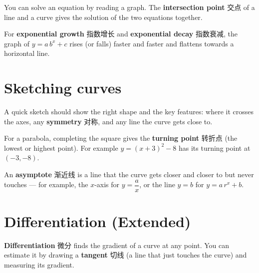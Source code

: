 \documentclass[11pt]{article}
\begin{document}
You can solve an equation by reading a graph. The \textbf{intersection point} 交点 of a line and a curve gives the solution of the two equations together.

For \textbf{exponential growth} 指数增长 and \textbf{exponential decay} 指数衰减, the graph of $y = a\,b^{x} + c$ rises (or falls) faster and faster and flattens towards a horizontal line.

\section*{Sketching curves}

A quick sketch should show the right shape and the key features: where it crosses the axes, any \textbf{symmetry} 对称, and any line the curve gets close to.

\begin{center}
\end{center}

For a parabola, completing the square gives the \textbf{turning point} 转折点 (the lowest or highest point). For example $y = (x + 3)^{2} - 8$ has its turning point at $(-3, -8)$.

An \textbf{asymptote} 渐近线 is a line that the curve gets closer and closer to but never touches — for example, the $x$-axis for $y = \dfrac{a}{x}$, or the line $y = b$ for $y = a\,r^{x} + b$.

\section*{Differentiation (Extended)}

\textbf{Differentiation} 微分 finds the gradient of a curve at any point. You can estimate it by drawing a \textbf{tangent} 切线 (a line that just touches the curve) and measuring its gradient.
\end{document}
